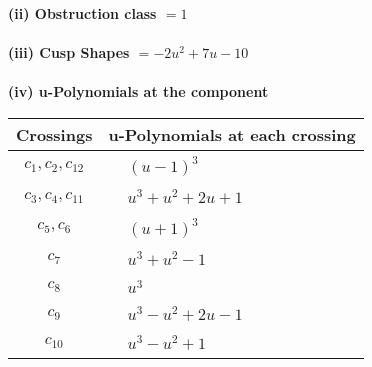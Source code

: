 \documentclass[1p]{elsarticle_modified}
\theoremstyle{definition}
\begin{document}
\flushleft \textbf{(ii) Obstruction class $= 1$}\\~\\
\flushleft \textbf{(iii) Cusp Shapes $= -2 u^2+7 u-10$}\\~\\
\newpage\renewcommand{\arraystretch}{1}
\flushleft \textbf{(iv) u-Polynomials at the component}\newline \\
\begin{tabular}{m{50pt}|m{274pt}}
Crossings & \hspace{64pt}u-Polynomials at each crossing \\
\hline $$\begin{aligned}c_{1},c_{2},c_{12}\end{aligned}$$&$\begin{aligned}
&(u-1)^3
\end{aligned}$\\
\hline $$\begin{aligned}c_{3},c_{4},c_{11}\end{aligned}$$&$\begin{aligned}
&u^3+u^2+2 u+1
\end{aligned}$\\
\hline $$\begin{aligned}c_{5},c_{6}\end{aligned}$$&$\begin{aligned}
&(u+1)^3
\end{aligned}$\\
\hline $$\begin{aligned}c_{7}\end{aligned}$$&$\begin{aligned}
&u^3+u^2-1
\end{aligned}$\\
\hline $$\begin{aligned}c_{8}\end{aligned}$$&$\begin{aligned}
&u^3
\end{aligned}$\\
\hline $$\begin{aligned}c_{9}\end{aligned}$$&$\begin{aligned}
&u^3- u^2+2 u-1
\end{aligned}$\\
\hline $$\begin{aligned}c_{10}\end{aligned}$$&$\begin{aligned}
&u^3- u^2+1
\end{aligned}$\\
\hline
\end{tabular}\\~\\
\end{document}
